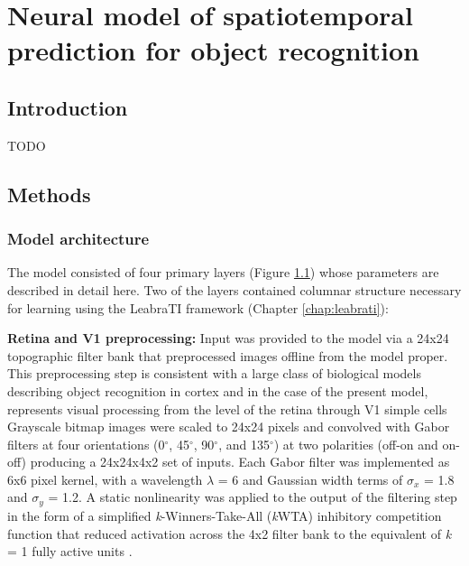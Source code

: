 \documentclass[dwyatte_dissertation.tex]{subfiles}
\begin{document}
\chapter{Neural model of spatiotemporal prediction for object recognition}

\section{Introduction}
TODO

\section{Methods}

\subsection{Model architecture}

The model consisted of four primary layers (Figure \ref{fig:v1_v2}) whose parameters are described in detail here. Two of the layers contained columnar structure necessary for learning using the LeabraTI framework (Chapter \ref{chap:leabrati}):

\begin{figure}[h!]
\begin{center}
\end{center}
\caption{}{}
\label{fig:v1_v2}
\end{figure}

\textbf{Retina and V1 preprocessing:} Input was provided to the model via a 24x24 topographic filter bank that preprocessed images offline from the model proper. This preprocessing step is consistent with a large class of biological models describing object recognition in cortex \cite[e.g.,]{RiesenhuberPoggio99,OReillyWyatteHerdEtAl13} and in the case of the present model, represents visual processing from the level of the retina through V1 simple cells \cite{HubelWiesel62} Grayscale bitmap images were scaled to 24x24 pixels and convolved with Gabor filters at four orientations (0$^\circ$, 45$^\circ$, 90$^\circ$, and 135$^\circ$) at two polarities (off-on and on-off) producing a 24x24x4x2 set of inputs. Each Gabor filter was implemented as 6x6 pixel kernel, with a wavelength $\lambda$ = 6 and Gaussian width terms of $\sigma_x$ = 1.8 and $\sigma_y$ = 1.2. A static nonlinearity was applied to the output of the filtering step in the form of a simplified \textit{k}-Winners-Take-All (\textit{k}WTA) inhibitory competition function that reduced activation across the 4x2 filter bank to the equivalent of \textit{k} = 1 fully active units \cite[see][Supporting Information]{OReillyWyatteHerdEtAl13}.
\end{document}
